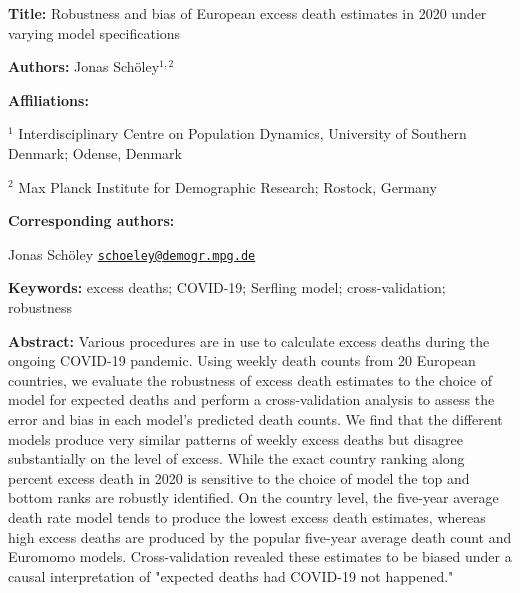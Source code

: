 \documentclass[12pt]{article}
\begin{document}
\begin{titlepage}

{\textbf{Title:}
Robustness and bias of European excess death estimates in 2020 under varying model specifications
\par\medskip}

{\textbf{Authors:}
Jonas Schöley$^{1,2}$
\par\medskip}

{\textbf{Affiliations:}\par
$^1$ Interdisciplinary Centre on Population Dynamics, University of Southern Denmark; Odense, Denmark\par
$^2$ Max Planck Institute for Demographic Research; Rostock, Germany\par
\par\medskip}

{\textbf{Corresponding authors:}\par
Jonas Schöley \href{mailto:schoeley@demogr.mpg.de}{\texttt{schoeley@demogr.mpg.de}}\par
\par\medskip}

{\textbf{Keywords:}
excess deaths; COVID-19; Serfling model; cross-validation; robustness
\par\medskip}

{\textbf{Abstract:}
Various procedures are in use to calculate excess deaths during the ongoing COVID-19 pandemic. Using weekly death counts from 20 European countries, we evaluate the robustness of excess death estimates to the choice of model for expected deaths and perform a cross-validation analysis to assess the error and bias in each model's predicted death counts. We find that the different models produce very similar patterns of weekly excess deaths but disagree substantially on the level of excess. While the exact country ranking along percent excess death in 2020 is sensitive to the choice of model the top and bottom ranks are robustly identified. On the country level, the five-year average death rate model tends to produce the lowest excess death estimates, whereas high excess deaths are produced by the popular five-year average death count and Euromomo models. Cross-validation revealed these estimates to be biased under a causal interpretation of "expected deaths had COVID-19 not happened."
\par\medskip}


\end{titlepage}
\end{document}
